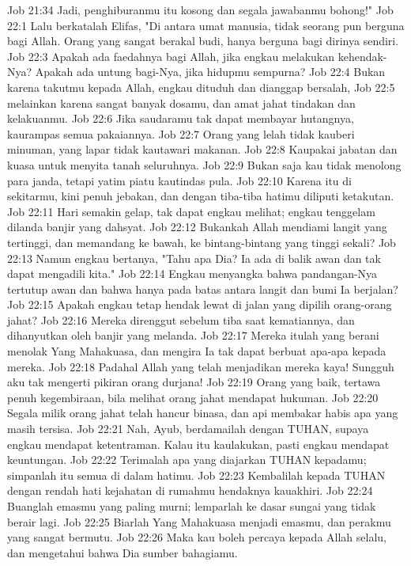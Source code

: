 Job 21:34  Jadi, penghiburanmu itu kosong dan segala jawabanmu bohong!"
Job 22:1  Lalu berkatalah Elifas, "Di antara umat manusia, tidak seorang pun berguna bagi Allah. Orang yang sangat berakal budi, hanya berguna bagi dirinya sendiri.
Job 22:3  Apakah ada faedahnya bagi Allah, jika engkau melakukan kehendak-Nya? Apakah ada untung bagi-Nya, jika hidupmu sempurna?
Job 22:4  Bukan karena takutmu kepada Allah, engkau dituduh dan dianggap bersalah,
Job 22:5  melainkan karena sangat banyak dosamu, dan amat jahat tindakan dan kelakuanmu.
Job 22:6  Jika saudaramu tak dapat membayar hutangnya, kaurampas semua pakaiannya.
Job 22:7  Orang yang lelah tidak kauberi minuman, yang lapar tidak kautawari makanan.
Job 22:8  Kaupakai jabatan dan kuasa untuk menyita tanah seluruhnya.
Job 22:9  Bukan saja kau tidak menolong para janda, tetapi yatim piatu kautindas pula.
Job 22:10  Karena itu di sekitarmu, kini penuh jebakan, dan dengan tiba-tiba hatimu diliputi ketakutan.
Job 22:11  Hari semakin gelap, tak dapat engkau melihat; engkau tenggelam dilanda banjir yang dahsyat.
Job 22:12  Bukankah Allah mendiami langit yang tertinggi, dan memandang ke bawah, ke bintang-bintang yang tinggi sekali?
Job 22:13  Namun engkau bertanya, "Tahu apa Dia? Ia ada di balik awan dan tak dapat mengadili kita."
Job 22:14  Engkau menyangka bahwa pandangan-Nya tertutup awan dan bahwa hanya pada batas antara langit dan bumi Ia berjalan?
Job 22:15  Apakah engkau tetap hendak lewat di jalan yang dipilih orang-orang jahat?
Job 22:16  Mereka direnggut sebelum tiba saat kematiannya, dan dihanyutkan oleh banjir yang melanda.
Job 22:17  Mereka itulah yang berani menolak Yang Mahakuasa, dan mengira Ia tak dapat berbuat apa-apa kepada mereka.
Job 22:18  Padahal Allah yang telah menjadikan mereka kaya! Sungguh aku tak mengerti pikiran orang durjana!
Job 22:19  Orang yang baik, tertawa penuh kegembiraan, bila melihat orang jahat mendapat hukuman.
Job 22:20  Segala milik orang jahat telah hancur binasa, dan api membakar habis apa yang masih tersisa.
Job 22:21  Nah, Ayub, berdamailah dengan TUHAN, supaya engkau mendapat ketentraman. Kalau itu kaulakukan, pasti engkau mendapat keuntungan.
Job 22:22  Terimalah apa yang diajarkan TUHAN kepadamu; simpanlah itu semua di dalam hatimu.
Job 22:23  Kembalilah kepada TUHAN dengan rendah hati kejahatan di rumahmu hendaknya kauakhiri.
Job 22:24  Buanglah emasmu yang paling murni; lemparlah ke dasar sungai yang tidak berair lagi.
Job 22:25  Biarlah Yang Mahakuasa menjadi emasmu, dan perakmu yang sangat bermutu.
Job 22:26  Maka kau boleh percaya kepada Allah selalu, dan mengetahui bahwa Dia sumber bahagiamu.
